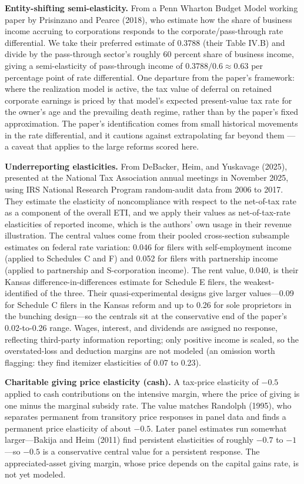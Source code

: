 \documentclass[10pt,twocolumn]{article}
\begin{document}
\textbf{Entity-shifting semi-elasticity.} From a Penn Wharton Budget Model
working paper by Prisinzano and Pearce (2018), who estimate how the share of
business income accruing to corporations responds to the
corporate/pass-through rate differential. We take their preferred estimate of
0.3788 (their Table IV.B) and divide by the pass-through sector's roughly 60
percent share of business income, giving a semi-elasticity of pass-through
income of $0.3788/0.6 \approx 0.63$ per percentage point of rate differential.
One departure from the paper's framework: where the realization model is
active, the tax value of deferral on retained corporate earnings is priced by
that model's expected present-value tax rate for the owner's age and the
prevailing death regime, rather than by
the paper's fixed approximation. The paper's identification comes from small
historical movements in the rate differential, and it cautions against
extrapolating far beyond them --- a caveat that applies to the large reforms
scored here.

\textbf{Underreporting elasticities.} From DeBacker, Heim, and Yuskavage
(2025), presented at the National Tax Association annual meetings in November
2025, using IRS National Research Program random-audit data from 2006 to 2017.
They estimate the elasticity of noncompliance with respect to the net-of-tax
rate as a component of the overall ETI, and we apply their values as
net-of-tax-rate elasticities of reported income, which is the authors' own
usage in their revenue illustration. The central values come from their pooled
cross-section subsample estimates on federal rate variation: 0.046 for filers
with self-employment income (applied to Schedules C and F) and 0.052 for
filers with partnership income (applied to partnership and S-corporation
income). The rent value, 0.040, is their Kansas difference-in-differences
estimate for Schedule E filers, the weakest-identified of the three. Their
quasi-experimental designs give larger values---0.09 for Schedule C filers in
the Kansas reform and up to 0.26 for sole proprietors in the bunching
design---so the centrals sit at the conservative end of the paper's
0.02-to-0.26 range. Wages, interest, and dividends are assigned no response,
reflecting third-party information reporting; only positive income is scaled,
so the overstated-loss and deduction margins are not modeled (an omission worth flagging: they find itemizer elasticities of 0.07 to 0.23).

\textbf{Charitable giving price elasticity (cash).} A tax-price elasticity of
$-0.5$ applied to cash contributions on the intensive margin, where the price
of giving is one minus the marginal subsidy rate. The value matches Randolph
(1995), who separates permanent from transitory price responses in panel data
and finds a permanent price elasticity of about $-0.5$. Later panel estimates
run somewhat larger---Bakija and Heim (2011) find persistent elasticities of
roughly $-0.7$ to $-1$---so $-0.5$ is a conservative central value for a
persistent response. The appreciated-asset giving margin, whose price depends on the capital gains
rate, is not yet modeled.
\end{document}
